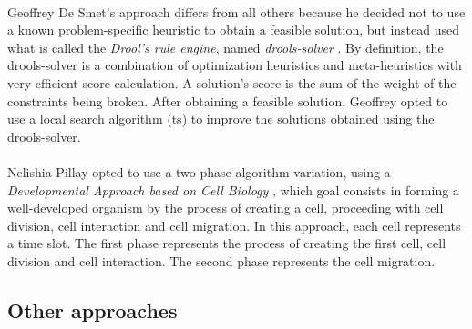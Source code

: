\\
Geoffrey De Smet's approach \cite{Smet2007} differs from all others because he decided not to use a known problem-specific heuristic to obtain a feasible solution, but instead used what is called the \textit{Drool's rule engine}, named \textit{drools-solver} \cite{Drools}. By definition, the drools-solver is a combination of optimization heuristics and meta-heuristics with very efficient score calculation. A solution's score is the sum of the weight of the constraints being broken. After obtaining a feasible solution, Geoffrey opted to use a local search algorithm (\gls{ts}) to improve the solutions obtained using the drools-solver.\\
\\
Nelishia Pillay opted to use a two-phase algorithm variation, using a \textit{Developmental Approach based on Cell Biology} \cite{Pillay2007}, which goal consists in forming a well-developed organism by the process of creating a cell, proceeding with cell division, cell interaction and cell migration. In this approach, each cell represents a time slot. The first phase represents the process of creating the first cell, cell division and cell interaction. The second phase represents the cell migration.

\subsection{Other approaches}
\label{subsection:OtherAppr}

